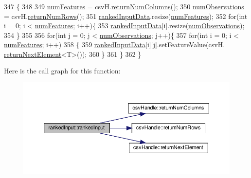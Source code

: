 \begin{DoxyCode}
347                                      \{
348 
349             \hyperlink{classrankedInput_ad86e2ad8f4044697450ddfdb15aa10a9}{numFeatures} = csvH.\hyperlink{classcsvHandle_a7dc362efe916e5a9707f26ad20d3c870}{returnNumColumns}();
350             \hyperlink{classrankedInput_a7b0e6ebcf6fa2fcd0b08918e3b3020be}{numObservations} = csvH.\hyperlink{classcsvHandle_a605aeef90b440e8c7b090999da3739a8}{returnNumRows}();
351             \hyperlink{classrankedInput_a5450364c3f258e15f28248a8a3c93ffa}{rankedInputData}.resize(\hyperlink{classrankedInput_ad86e2ad8f4044697450ddfdb15aa10a9}{numFeatures});
352             \textcolor{keywordflow}{for}(\textcolor{keywordtype}{int} i = 0; i < \hyperlink{classrankedInput_ad86e2ad8f4044697450ddfdb15aa10a9}{numFeatures}; i++)\{
353                 \hyperlink{classrankedInput_a5450364c3f258e15f28248a8a3c93ffa}{rankedInputData}[i].resize(\hyperlink{classrankedInput_a7b0e6ebcf6fa2fcd0b08918e3b3020be}{numObservations});
354             \}
355 
356             \textcolor{keywordflow}{for}(\textcolor{keywordtype}{int} j = 0; j < \hyperlink{classrankedInput_a7b0e6ebcf6fa2fcd0b08918e3b3020be}{numObservations}; j++)\{
357                 \textcolor{keywordflow}{for}(\textcolor{keywordtype}{int} i = 0; i < \hyperlink{classrankedInput_ad86e2ad8f4044697450ddfdb15aa10a9}{numFeatures}; i++)
358                 \{
359                     \hyperlink{classrankedInput_a5450364c3f258e15f28248a8a3c93ffa}{rankedInputData}[i][j].setFeatureValue(csvH.
      \hyperlink{classcsvHandle_a28f8ee0fa06f1c78132b3551da272bde}{returnNextElement}<T>());   
360                 \}
361             \}
362         \}
\end{DoxyCode}
Here is the call graph for this function\+:\nopagebreak
\begin{figure}[H]
\begin{center}
\leavevmode
\includegraphics[width=350pt]{classrankedInput_a68fd13cc8d6784da58717a85f811fbf3_cgraph}
\end{center}
\end{figure}
\mbox{\label{classrankedInput_a5b881de847a501b5c6857f6f3ade26a2}} 
